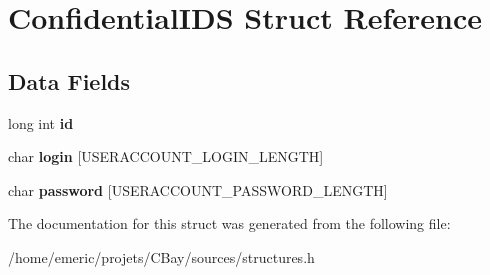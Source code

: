 \hypertarget{struct_confidential_i_d_s}{\section{Confidential\-I\-D\-S Struct Reference}
\label{struct_confidential_i_d_s}
}
\subsection*{Data Fields}
\begin{DoxyCompactItemize}
\item 
\hypertarget{struct_confidential_i_d_s_a53f4656a3ccbae3d40e94f582eef745f}{long int {\bfseries id}}\label{struct_confidential_i_d_s_a53f4656a3ccbae3d40e94f582eef745f}

\item 
\hypertarget{struct_confidential_i_d_s_a4bf7e90f51b7f7d3617117ae6f12c052}{char {\bfseries login} \mbox{[}U\-S\-E\-R\-A\-C\-C\-O\-U\-N\-T\-\_\-\-L\-O\-G\-I\-N\-\_\-\-L\-E\-N\-G\-T\-H\mbox{]}}\label{struct_confidential_i_d_s_a4bf7e90f51b7f7d3617117ae6f12c052}

\item 
\hypertarget{struct_confidential_i_d_s_a79861f2b044c93f50ef5ffe118c1e28d}{char {\bfseries password} \mbox{[}U\-S\-E\-R\-A\-C\-C\-O\-U\-N\-T\-\_\-\-P\-A\-S\-S\-W\-O\-R\-D\-\_\-\-L\-E\-N\-G\-T\-H\mbox{]}}\label{struct_confidential_i_d_s_a79861f2b044c93f50ef5ffe118c1e28d}

\end{DoxyCompactItemize}


The documentation for this struct was generated from the following file\-:\begin{DoxyCompactItemize}
\item 
/home/emeric/projets/\-C\-Bay/sources/structures.\-h\end{DoxyCompactItemize}
